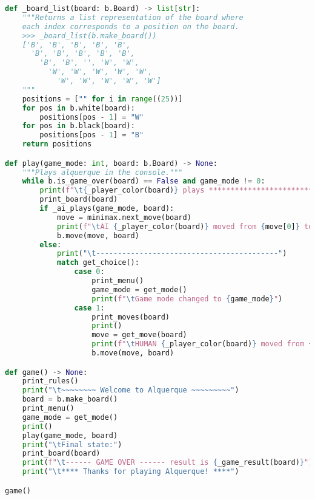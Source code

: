 \documentclass{article}
\begin{document}
\begin{lstlisting}[language=Python, caption={kildekode}, label={code:kildekode}]
def _board_list(board: b.Board) -> list[str]:
    """Returns a list representation of the board where
    each index corresponds to a position on the board.
    >>> _board_list(b.make_board())
    ['B', 'B', 'B', 'B', 'B',
      'B', 'B', 'B', 'B', 'B',
        'B', 'B', '', 'W', 'W',
          'W', 'W', 'W', 'W', 'W',
            'W', 'W', 'W', 'W', 'W']
    """
    positions = ["" for i in range((25))]
    for pos in b.white(board):
        positions[pos - 1] = "W"
    for pos in b.black(board):
        positions[pos - 1] = "B"
    return positions

def play(game_mode: int, board: b.Board) -> None:
    """Plays alquerque in the console."""
    while b.is_game_over(board) == False and game_mode != 0:
        print(f"\t{_player_color(board)} plays *****************************")
        print_board(board)
        if _ai_plays(game_mode, board):
            move = minimax.next_move(board)
            print(f"\tAI {_player_color(board)} moved from {move[0]} to {move[1]}")
            b.move(move, board)        
        else:
            print("\t------------------------------------------")
            match get_choice():
                case 0:
                    print_menu()
                    game_mode = get_mode()
                    print(f"\tGame mode changed to {game_mode}")
                case 1:
                    print_moves(board)
                    print()
                    move = get_move(board)
                    print(f"\tHUMAN {_player_color(board)} moved from {move[0]} to {move[1]}")
                    b.move(move, board)

def game() -> None:
    print_rules()
    print("\t~~~~~~~~ Welcome to Alquerque ~~~~~~~~~")
    board = b.make_board()
    print_menu()
    game_mode = get_mode()
    print()
    play(game_mode, board)
    print("\tFinal state:")
    print_board(board)
    print(f"\t------ GAME OVER ------ result is {_game_result(board)}")
    print("\t**** Thanks for playing Alquerque! ****")

game()
\end{lstlisting}
\end{document}
